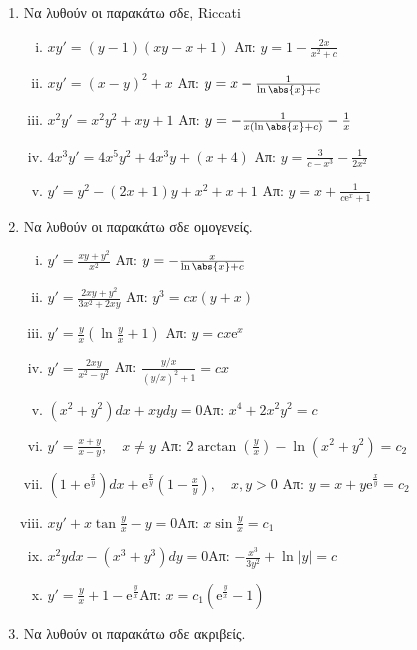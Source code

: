 \begin{enumerate}
  \item Να λυθούν οι παρακάτω σδε, \textlatin{Riccati}
    \begin{enumerate}[i)]
      \item $xy'=(y-1)(xy-x+1)$ \hfill Απ: $y=1-\frac{2x}{x^2+c}$
      \item $xy'=(x-y)^2+x$ \hfill Απ: $y=x-\frac{1}{\ln\abs{x}+c}$
      \item $x^2y'=x^2y^2+xy+1$ \hfill Απ: $y=-\frac{1}{x(\ln\abs{x}+c)}-\frac{1}{x}$
      \item $4x^3y'=4x^5y^2+4x^3y+(x+4)$ \hfill Απ: $y=\frac{3}{c-x^3}-\frac{1}{2x^2}$
      \item $y'=y^2-(2x+1)y+x^2+x+1$ \hfill Απ: $y=x+\frac{1}{c \mathrm{e}^x+1}$
    \end{enumerate}

  \item Να λυθούν οι παρακάτω σδε ομογενείς.

    \begin{enumerate}[i)]
      \item $ y' = \frac{xy+y^{2}}{x^{2}} $ %
        \hfill Απ: $ y= - \frac{x}{\ln{\abs{x} } + c} $ 
      \item $ y' = \frac{2xy+y^{2}}{3x^{2}+2xy} $ %
        \hfill Απ: $ y^{3}=cx(y+x) $ 
      \item $ y' = \frac{y}{x} (\ln{\frac{y}{x}} +1) $ %
        \hfill Απ: $ y=cx \mathrm{e}^{x} $ 
      \item $ y' = \frac{2xy}{x^{2}-y^{2}} $ %
        \hfill Απ: $ \frac{y/x}{(y/x)^{2}+1} = cx $ 
      \item $(x^2+y^2)dx+xydy=0$\hfill Απ: $x^4+2x^2y^2=c$
      \item $y'=\frac{x+y}{x-y}, \quad x\neq y$
        \hfill Απ: $2\arctan (\frac{y}{x})-\ln (x^2+y^2)=c_2$
      \item $(1+ \mathrm{e}^{\frac{x}{y}})dx+ \mathrm{e}^{\frac{x}{y}}(1-\frac{x}{y}), 
        \quad x,y>0$
        \hfill Απ: $y=x+y \mathrm{e}^{\frac{x}{y}}=c_2$
      \item $xy'+x\tan \frac{y}{x}-y=0$\hfill Απ: $x\sin \frac{y}{x}=c_1$
      \item $x^2ydx-(x^3+y^3)dy=0$\hfill Απ: $-\frac{x^3}{3y^2}+\ln|y|=c$
      \item $y'=\frac{y}{x}+1- \mathrm{e}^{\frac{y}{x}}$\hfill Απ: $x=c_1(
        \mathrm{e}^{\frac{y}{x}}-1)$
    \end{enumerate}

  \item Να λυθούν οι παρακάτω σδε ακριβείς.


\end{enumerate}
